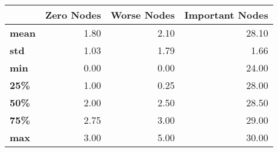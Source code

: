 \begin{tabular}{lrrr}
\toprule
{} &  Zero Nodes &  Worse Nodes &  Important Nodes \\
\midrule
\textbf{mean} &        1.80 &         2.10 &            28.10 \\
\textbf{std } &        1.03 &         1.79 &             1.66 \\
\textbf{min } &        0.00 &         0.00 &            24.00 \\
\textbf{25\% } &        1.00 &         0.25 &            28.00 \\
\textbf{50\% } &        2.00 &         2.50 &            28.50 \\
\textbf{75\% } &        2.75 &         3.00 &            29.00 \\
\textbf{max } &        3.00 &         5.00 &            30.00 \\
\bottomrule
\end{tabular}
